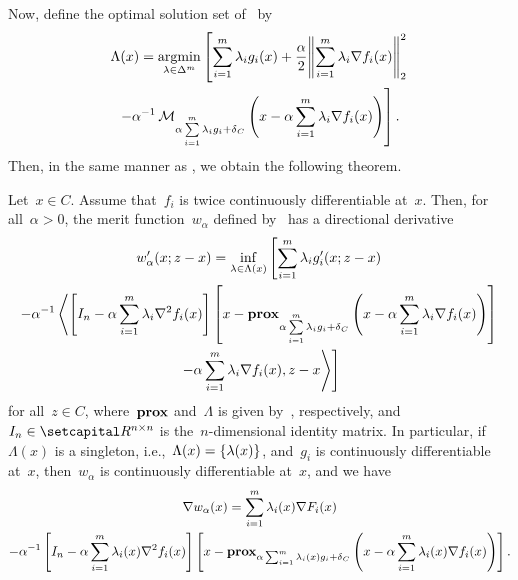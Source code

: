 \documentclass[../../main]{subfiles}
\begin{document}
Now, define the optimal solution set of~ by
\begin{multline} \label{eq:Pi}
    \Lambda(x) = \argmin_{\lambda \in \Delta^m} \left[ \sum_{i = 1}^{m} \lambda_i g_i(x) + \frac{\alpha}{2} \norm*{\sum_{i = 1}^{m} \lambda_i \nabla f_i(x)}_2^2 \right. \\
        \left. - \alpha^{-1} \envelope_{\alpha \sum\limits_{i = 1}^{m} \lambda_i g_i + \indicator_C}\left( x - \alpha \sum_{i = 1}^{m} \lambda_i \nabla f_i(x) \right) \right]
    .\end{multline}
Then, in the same manner as , we obtain the following theorem.
\begin{theorem} 
    Let~$x \in C$.
    Assume that~$f_i$ is twice continuously differentiable at~$x$.
    Then, for all~$\alpha > 0$, the merit function~$w_\alpha$ defined by~ has a directional derivative
    \begin{multline}
        w_\alpha'(x; z - x) = \inf_{\lambda \in \Lambda(x)} \left[ \sum_{i = 1}^{m} \lambda_i g_i'(x; z - x) \right. \\
            - \alpha^{-1} \left\langle \left[ I_n - \alpha \sum_{i = 1}^{m} \lambda_i \nabla^2 f_i(x) \right] \left[x - \prox_{\alpha \sum\limits_{i = 1}^{m} \lambda_i g_i + \indicator_C} \left( x - \alpha \sum_{i = 1}^{m} \lambda_i \nabla f_i(x) \right) \right] \right.\\
            \left. \left.- \alpha \sum_{i = 1}^{m} \lambda_i \nabla f_i(x) , z - x \right\rangle \right]
    \end{multline}
    for all~$z \in C$, where~$\prox$ and~$\Lambda$ is given by~, respectively, and~$I_n \in \setR^{n \times n}$ is the~$n$-dimensional identity matrix.
    In particular, if~$\Lambda(x)$ is a singleton, i.e.,~$\Lambda(x) = \set*{\lambda(x)}$, and~$g_i$ is continuously differentiable at~$x$, then~$w_\alpha$ is continuously differentiable at~$x$, and we have
    \begin{multline}
        \nabla w_\alpha(x) = \sum_{i = 1}^{m} \lambda_i(x) \nabla F_i(x) \\
        - \alpha^{-1} \left[ I_n - \alpha \sum_{i = 1}^{m} \lambda_i(x) \nabla^2 f_i(x) \right] \left[x - \prox_{\alpha \sum_{i = 1}^{m} \lambda_i(x) g_i + \indicator_C} \left( x - \alpha \sum_{i = 1}^{m} \lambda_i(x) \nabla f_i(x) \right) \right]
        .\end{multline}
\end{theorem}
\end{document}
